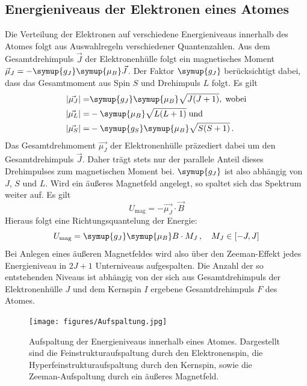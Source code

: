 \subsection{Energieniveaus der Elektronen eines Atomes}
%
Die Verteilung der Elektronen auf verschiedene Energieniveaus innerhalb des
Atomes folgt aus Auswahlregeln verschiedener Quantenzahlen. Aus dem
Gesamtdrehimpuls $\vec{J}$ der Elektronenhülle folgt ein magnetisches Moment
$\vec{\mu}_J=-\symup{g_J}\symup{\mu_B}\vec{J}$. Der Faktor $\symup{g_J}$
berücksichtigt dabei, dass das Gesamtmoment aus Spin $S$ und Drehimpuls $L$
folgt. Es gilt
%
\begin{align*}
  |\vec{\mu_J}|=&\symup{g_J}\symup{\mu_B}\sqrt{J(J+1)}, \;\text{wobei} \\
  |\vec{\mu_L}|=&-\symup{\mu_B}\sqrt{L(L+1)} \;\text{und} \\
  |\vec{\mu_S}|=&-\symup{g_S}\symup{\mu_B}\sqrt{S(S+1)} \, .
\end{align*}
%
Das Gesamtdrehmoment $\vec{\mu_J}$ der Elektronenhülle präzediert dabei um den
Gesamtdrehimpuls $\vec{J}$. Daher trägt stets nur der parallele Anteil dieses
Drehimpulses zum magnetischen Moment bei. $\symup{g_J}$ ist also abhängig von
$J$, $S$ und $L$. Wird ein äußeres Magnetfeld angelegt, so spaltet sich das
Spektrum weiter auf. Es gilt
%
\begin{equation}
  U_\text{mag}=-\vec{\mu_J}\cdot\vec{B}
\end{equation}
%
Hieraus folgt eine Richtungsquantelung der Energie:
%
\begin{equation}
  U_\text{mag}=\symup{g_J}\symup{\mu_B}B\cdot M_J\, ,\quad M_J\in[-J,J]
\end{equation}
%
Bei Anlegen eines äußeren Magnetfeldes wird also über den Zeeman-Effekt jedes
Energieniveau in $2J+1$ Unterniveaus aufgespalten. Die Anzahl der so
entstehenden Niveaus ist abhängig von der sich aus Gesamtdrehimpuls der
Elektronenhülle $J$ und dem Kernspin $I$ ergebene Gesamtdrehimpuls $F$ des
Atomes.
%
\begin{figure}[htb]
  \centering
  \texttt{[image: figures/Aufspaltung.jpg]}
  \caption{Aufspaltung der Energieniveaus innerhalb eines Atomes. Dargestellt sind die Feinstrukturaufspaltung durch den Elektronenspin, die Hyperfeinstrukturaufspaltung durch den Kernspin, sowie die Zeeman-Aufspaltung durch ein äußeres Magnetfeld.}
  \label{fig:aufspaltung}
\end{figure}
%

